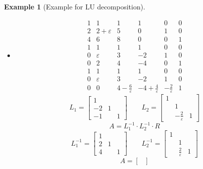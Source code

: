 \documentclass[a4paper,landscape,twocolumn]{article}
\newtheorem{ex}{Example}
\begin{document}
\begin{ex}[Example for LU decomposition]
\begin{itemize}
\[\begin{bmatrix}
            2 & 0 & 1
          \end{bmatrix} \cdot \begin{bmatrix}
            1 & 1 & 1 \\
              & 2 & 4 \\
              &   & 3
          \end{bmatrix}
      \]
    \item
      \[
        \begin{array}{ccc|ccc}
          1 & 1 & 1 & 1 & 0 & 0 \\
          2 & 2+\varepsilon & 5 & 0 & 1 & 0 \\
          4 & 6 & 8 & 0 & 0 & 1 \\
        \hline
          1 & 1 & 1 & 1 & 0 & 0 \\
          0 & \varepsilon & 3 & -2 & 1 & 0 \\
          0 & 2 & 4 & -4 & 0 & 1 \\
        \hline
          1 & 1 & 1 & 1 & 0 & 0 \\
          0 & \varepsilon & 3 & -2 & 1 & 0 \\
          0 & 0 & 4-\frac6{\varepsilon} & -4+\frac4{\varepsilon} & -\frac2\varepsilon & 1
        \end{array}
      \] \[
        L_1 = \begin{bmatrix}
           1 &   & \\
          -2 & 1 & \\
          -1 &   & 1
        \end{bmatrix}
        \qquad
        L_2 = \begin{bmatrix}
          1 &   & \\
            & 1 & \\
            & -\frac2\varepsilon & 1
        \end{bmatrix}
      \] \[
        A = L_1^{-1} \cdot L_2^{-1} \cdot R
      \] \[
        L_1^{-1} = \begin{bmatrix}
          1 &   & \\
          2 & 1 & \\
          4 &   & 1
        \end{bmatrix} \qquad
        L_2^{-1} = \begin{bmatrix}
          1 &   & \\
            & 1 & \\
            & \frac2\varepsilon & 1
        \end{bmatrix}
      \] \[
        A = \begin{bmatrix}

\end{bmatrix}\]
\end{itemize}
\end{ex}
\end{document}
